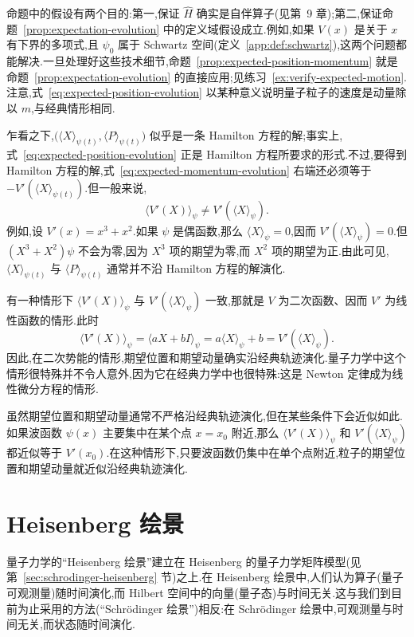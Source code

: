 命题中的假设有两个目的:第一,保证 \(\widehat H\) 确实是自伴算子(见第~9 章);第二,保证命题~\ref{prop:expectation-evolution} 中的定义域假设成立.例如,如果 \(V(x)\) 是关于 \(x\) 有下界的多项式,且 \(\psi_{0}\) 属于 Schwartz 空间(定义~\ref{app:def:schwartz}),这两个问题都能解决.一旦处理好这些技术细节,命题~\ref{prop:expected-position-momentum} 就是命题~\ref{prop:expectation-evolution} 的直接应用;见练习~\ref{ex:verify-expected-motion}.注意,式~\eqref{eq:expected-position-evolution} 以某种意义说明量子粒子的速度是动量除以 \(m\),与经典情形相同.

乍看之下,\(\bigl(\langle X\rangle_{\psi(t)},\langle P\rangle_{\psi(t)}\bigr)\) 似乎是一条 Hamilton 方程的解;事实上,式~\eqref{eq:expected-position-evolution} 正是 Hamilton 方程所要求的形式.不过,要得到 Hamilton 方程的解,式~\eqref{eq:expected-momentum-evolution} 右端还必须等于 \(-V'(\langle X\rangle_{\psi(t)})\).但一般来说,
\[
\langle V'(X)\rangle_{\psi}\ne V'(\langle X\rangle_{\psi}).
\]
例如,设 \(V'(x)=x^{3}+x^{2}\).如果 \(\psi\) 是偶函数,那么 \(\langle X\rangle_{\psi}=0\),因而 \(V'(\langle X\rangle_{\psi})=0\).但 \((X^{3}+X^{2})\psi\) 不会为零,因为 \(X^{3}\) 项的期望为零,而 \(X^{2}\) 项的期望为正.由此可见,\(\langle X\rangle_{\psi(t)}\) 与 \(\langle P\rangle_{\psi(t)}\) 通常并不沿 Hamilton 方程的解演化.

有一种情形下 \(\langle V'(X)\rangle_{\psi}\) 与 \(V'(\langle X\rangle_{\psi})\) 一致,那就是 \(V\) 为二次函数、因而 \(V'\) 为线性函数的情形.此时
\[
\langle V'(X)\rangle_{\psi}
=\langle aX+bI\rangle_{\psi}
=a\langle X\rangle_{\psi}+b
=V'(\langle X\rangle_{\psi}).
\]
因此,在二次势能的情形,期望位置和期望动量确实沿经典轨迹演化.量子力学中这个情形很特殊并不令人意外,因为它在经典力学中也很特殊:这是 Newton 定律成为线性微分方程的情形.

虽然期望位置和期望动量通常不严格沿经典轨迹演化,但在某些条件下会近似如此.如果波函数 \(\psi(x)\) 主要集中在某个点 \(x=x_{0}\) 附近,那么 \(\langle V'(X)\rangle_{\psi}\) 和 \(V'(\langle X\rangle_{\psi})\) 都近似等于 \(V'(x_{0})\).在这种情形下,只要波函数仍集中在单个点附近,粒子的期望位置和期望动量就近似沿经典轨迹演化.
\section{Heisenberg 绘景}\label{sec:heisenberg-picture}

量子力学的“Heisenberg 绘景”建立在 Heisenberg 的量子力学矩阵模型(见第~\ref{sec:schrodinger-heisenberg} 节)之上.在 Heisenberg 绘景中,人们认为算子(量子可观测量)随时间演化,而 Hilbert 空间中的向量(量子态)与时间无关.这与我们到目前为止采用的方法(“Schrödinger 绘景”)相反:在 Schrödinger 绘景中,可观测量与时间无关,而状态随时间演化.

